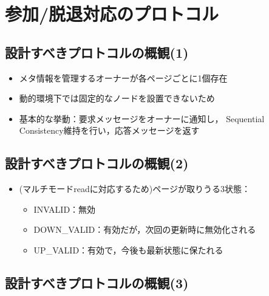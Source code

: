 \documentclass[25pt,landscape,papersize]{jsarticle}
\begin{document}
\section{参加/脱退対応のプロトコル}

\subsection{設計すべきプロトコルの概観(1)}

\begin{itemize}
\item メタ情報を管理するオーナーが各ページごとに1個存在
\item 動的環境下では固定的なノードを設置できないため
\item 基本的な挙動：要求メッセージをオーナーに通知し，
  Sequential Consistency維持を行い，応答メッセージを返す
\end{itemize}


\subsection{設計すべきプロトコルの概観(2)}

\begin{itemize}
\item (マルチモードreadに対応するため)ページが取りうる3状態：
  \begin{itemize}
  \item INVALID：無効
  \item DOWN\_VALID：有効だが，次回の更新時に無効化される
  \item UP\_VALID：有効で，今後も最新状態に保たれる
  \end{itemize}
\end{itemize}

\subsection{設計すべきプロトコルの概観(3)}
\end{document}
